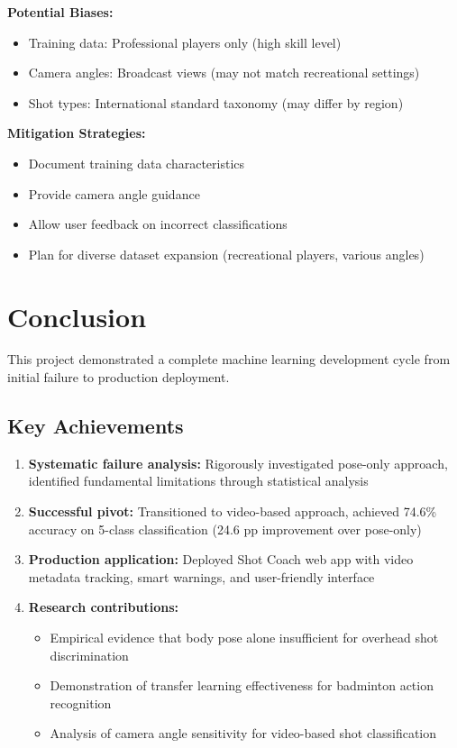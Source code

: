 \documentclass[12pt,a4paper]{article}
\begin{document}
\textbf{Potential Biases:}
\begin{itemize}
\item Training data: Professional players only (high skill level)
\item Camera angles: Broadcast views (may not match recreational settings)
\item Shot types: International standard taxonomy (may differ by region)
\end{itemize}

\textbf{Mitigation Strategies:}
\begin{itemize}
\item Document training data characteristics
\item Provide camera angle guidance
\item Allow user feedback on incorrect classifications
\item Plan for diverse dataset expansion (recreational players, various angles)
\end{itemize}

\section{Conclusion}

This project demonstrated a complete machine learning development cycle from initial failure to production deployment.

\subsection{Key Achievements}

\begin{enumerate}
\item \textbf{Systematic failure analysis:} Rigorously investigated pose-only approach, identified fundamental limitations through statistical analysis

\item \textbf{Successful pivot:} Transitioned to video-based approach, achieved 74.6\% accuracy on 5-class classification (24.6 pp improvement over pose-only)

\item \textbf{Production application:} Deployed Shot Coach web app with video metadata tracking, smart warnings, and user-friendly interface

\item \textbf{Research contributions:}
   \begin{itemize}
   \item Empirical evidence that body pose alone insufficient for overhead shot discrimination
   \item Demonstration of transfer learning effectiveness for badminton action recognition
   \item Analysis of camera angle sensitivity for video-based shot classification
   \end{itemize}
\end{enumerate}
\end{document}
